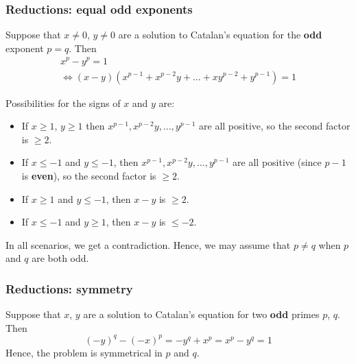 \begin{frame}
\frametitle{Reductions: equal odd exponents}

Suppose that \(x \neq 0\), \(y \neq 0\) are a solution to Catalan's equation for the \textbf{odd} exponent \(p = q\).
\pause
Then
\begin{gather*}
    x^p - y^p = 1 \\
    \iff (x - y)(x^{p - 1} + x^{p - 2} y + \dots + x y^{p - 2} + y^{p - 1}) = 1
\end{gather*}

\pause

Possibilities for the signs of \(x\) and \(y\) are:
{\scriptsize
\begin{itemize}
    \item If \(x \geq 1\), \(y \geq 1\) then \(x^{p - 1}, x^{p - 2} y, \dots, y^{p - 1}\) are all positive, so the second factor is \(\geq 2\).

    \item If \(x \leq -1\) and \(y \leq -1\), then \(x^{p - 1}, x^{p - 2} y, \dots, y^{p - 1}\) are all positive (since \(p - 1\) is \textbf{even}), so the second factor is \(\geq 2\).

    \item If \(x \geq 1\) and \(y \leq -1\), then \(x - y\) is \(\geq 2\).

    \item If \(x \leq -1\) and \(y \geq 1\), then \(x - y\) is \(\leq -2\).
\end{itemize}
}
In all scenarios, we get a contradiction. Hence, we may assume that \(p \neq q\) when \(p\) and \(q\) are both odd.
\end{frame}

\begin{frame}
\frametitle{Reductions: symmetry}

Suppose that \(x\), \(y\) are a solution to Catalan's equation for two \textbf{odd} primes \(p\), \(q\). Then
\[
    (-y)^q - (-x)^p = - y^q + x^p = x^p - y^q = 1
\]
Hence, the problem is symmetrical in \(p\) and \(q\).
\end{frame}
